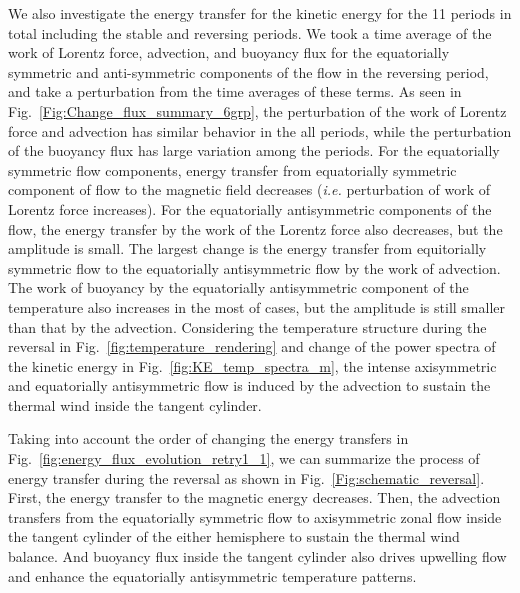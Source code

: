We also investigate the energy 
{\color{red} transfer}
for the kinetic energy for the 11 periods in total including the stable and reversing periods. 
We took a time average of the work of Lorentz force, advection, and buoyancy flux for the equatorially symmetric and anti-symmetric components of the flow in the reversing period, and take a perturbation from the time averages of these terms. 
As seen in Fig.~\ref{Fig:Change_flux_summary_6grp}, the perturbation of the work of Lorentz force and advection has similar behavior in the all periods, while the perturbation of the buoyancy flux has large variation among the periods.
For the equatorially symmetric flow components, energy transfer from equatorially symmetric component of flow to the magnetic field decreases ({\it i.e.} perturbation of work of Lorentz force increases). 
For the equatorially antisymmetric components of the flow, the energy transfer by the work of the Lorentz force also decreases, but the amplitude is small. 
The largest change is the energy transfer from equitorially symmetric flow to the equatorially antisymmetric flow by the work of advection. 
The work of buoyancy by the equatorially antisymmetric component of the temperature also increases in the most of cases, but the amplitude is still smaller than that by the advection. 
Considering the temperature structure during the reversal in Fig.~\ref{fig:temperature_rendering} and change of the power spectra of the kinetic energy in Fig.~\ref{fig:KE_temp_spectra_m}, the intense axisymmetric and equatorially antisymmetric flow is induced by the advection to sustain the thermal wind inside the tangent cylinder. 

Taking into account the order of changing the energy 
{\color{red} transfers}
in Fig.~\ref{fig:energy_flux_evolution_retry1_1}, we can summarize the process of energy transfer during the reversal as shown in Fig.~\ref{Fig:schematic_reversal}. 
First, the energy transfer to the magnetic energy decreases. 
Then, the advection transfers from the equatorially symmetric flow to axisymmetric zonal flow inside the tangent cylinder of the either hemisphere to sustain the thermal wind balance. 
And buoyancy flux inside the tangent cylinder also drives upwelling flow and enhance the equatorially antisymmetric temperature patterns.

